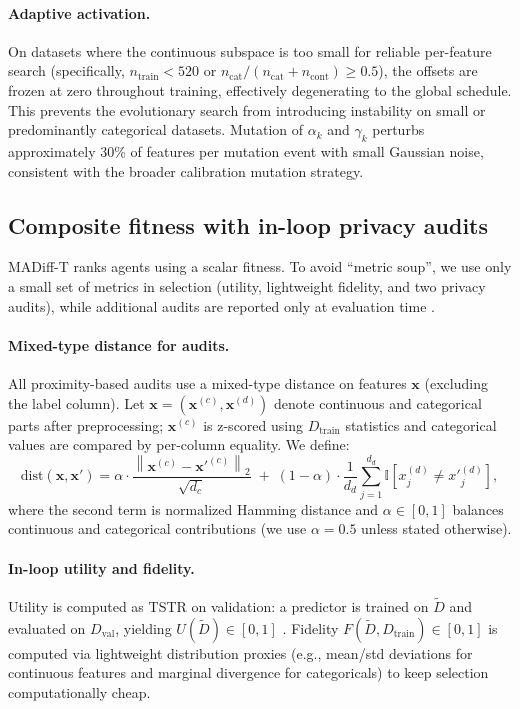 \documentclass[preprint,12pt]{elsarticle}
\begin{document}
\paragraph{Adaptive activation.}
On datasets where the continuous subspace is too small for reliable per-feature search (specifically, $n_{\text{train}} < 520$ or $n_{\text{cat}}/(n_{\text{cat}}+n_{\text{cont}}) \geq 0.5$), the offsets are frozen at zero throughout training, effectively degenerating to the global schedule. This prevents the evolutionary search from introducing instability on small or predominantly categorical datasets. Mutation of $\alpha_k$ and $\gamma_k$ perturbs approximately 30\% of features per mutation event with small Gaussian noise, consistent with the broader calibration mutation strategy.
\subsection{Composite fitness with in-loop privacy audits}
\label{sec:method_fitness}

MADiff-T ranks agents using a scalar fitness. To avoid ``metric soup'', we use only a small set of metrics in selection (utility, lightweight fidelity, and two privacy audits), while additional audits are reported only at evaluation time \cite{Hernandez2025,Hyrup2025}.

\paragraph{Mixed-type distance for audits.}
All proximity-based audits use a mixed-type distance on features $\mathbf{x}$ (excluding the label column). Let $\mathbf{x}=(\mathbf{x}^{(c)},\mathbf{x}^{(d)})$ denote continuous and categorical parts after preprocessing; $\mathbf{x}^{(c)}$ is z-scored using $D_{\text{train}}$ statistics and categorical values are compared by per-column equality. We define:
\begin{equation}
\mathrm{dist}(\mathbf{x},\mathbf{x}')=\alpha \cdot \frac{\left\|\mathbf{x}^{(c)}-\mathbf{x}'^{(c)}\right\|_2}{\sqrt{d_c}}
\;+\;
(1-\alpha)\cdot \frac{1}{d_d}\sum_{j=1}^{d_d}\mathbb{I}\!\left[x^{(d)}_j\neq x'^{(d)}_j\right],
\label{eq:mixdist}
\end{equation}
where the second term is normalized Hamming distance and $\alpha\in[0,1]$ balances continuous and categorical contributions (we use $\alpha=0.5$ unless stated otherwise).

\paragraph{In-loop utility and fidelity.}
Utility is computed as TSTR on validation: a predictor is trained on $\tilde{D}$ and evaluated on $D_{\text{val}}$, yielding $U(\tilde{D})\in[0,1]$ \cite{Jia2024}. Fidelity $F(\tilde{D},D_{\text{train}})\in[0,1]$ is computed via lightweight distribution proxies (e.g., mean/std deviations for continuous features and marginal divergence for categoricals) to keep selection computationally cheap.
\end{document}
